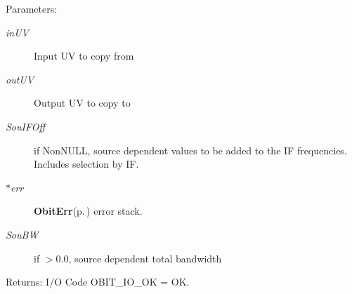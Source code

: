 \begin{Desc}
\item[Parameters:]
\begin{description}
\item[{\em in\-UV}]Input UV to copy from \item[{\em out\-UV}]Output UV to copy to \item[{\em Sou\-IFOff}]if Non\-NULL, source dependent values to be added to the IF frequencies. Includes selection by IF. \item[{\em $\ast$err}]{\bf Obit\-Err}{\rm (p.\,\pageref{structObitErr})} error stack. \item[{\em Sou\-BW}]if $>$0.0, source dependent total bandwidth \end{description}
\end{Desc}
\begin{Desc}
\item[Returns:]I/O Code OBIT\_\-IO\_\-OK = OK. \end{Desc}
